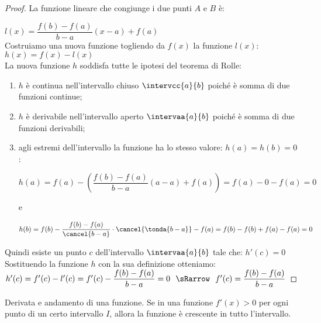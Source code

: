 \begin{proof}
La funzione lineare che congiunge i due punti \(A\) e \(B\) è:

\(l(x) = \dfrac{f(b)-f(a)}{b-a}(x-a) + f(a)\)\\
Costruiamo una nuova funzione togliendo da \(f(x)\) la funzione 
\(l(x)\): \quad 
\(h(x) = f(x) - l(x)\) \\
La nuova funzione \(h\) soddisfa tutte le ipotesi del teorema di Rolle:
\begin{enumerate}[nosep]
\item \(h\) è continua nell'intervallo chiuso \(\intervcc{a}{b}\)
poiché è somma di due funzioni continue;
\item \(h\) è derivabile nell'intervallo aperto \(\intervaa{a}{b}\)
poiché è somma di due funzioni derivabili;
\item agli estremi dell'intervallo la funzione ha lo stesso 
valore: \(h(a) = h(b) = 0\):

\(h(a) = f(a) - (\dfrac{f(b)-f(a)}{b-a}(a-a) + f(a)) = f(a)-0-f(a) = 0\)

e 

\(h(b) = %
f(b)-\dfrac{f(b)-f(a)}{\cancel{b-a}} \cdot 
\cancel{\tonda{b-a}}-f(a)=f(b)-f(b)+f(a)-f(a)=0\)
\end{enumerate}

Quindi esiste un punto \(c\) dell'intervallo \(\intervaa{a}{b}\) tale che:
\quad \(h'(c)=0\) \\
Sostituendo la funzione \(h\) con la sua definizione otteniamo:\\[4mm]
\hspace*{15mm}\(h'(c) = f'(c)-l'(c)= f'(c)-\dfrac{f(b)-f(a)}{b-a}=0 
~~\sRarrow ~~
f'(c)=\dfrac{f(b)-f(a)}{b-a}\)
\end{proof}


\begin{newcor}{}{}
Derivata e andamento di una funzione. Se in una funzione \(f'(x)>0\) per ogni 
punto di un certo intervallo \(I\), allora la funzione è crescente in tutto 
l'intervallo.
\end{newcor}
% 

